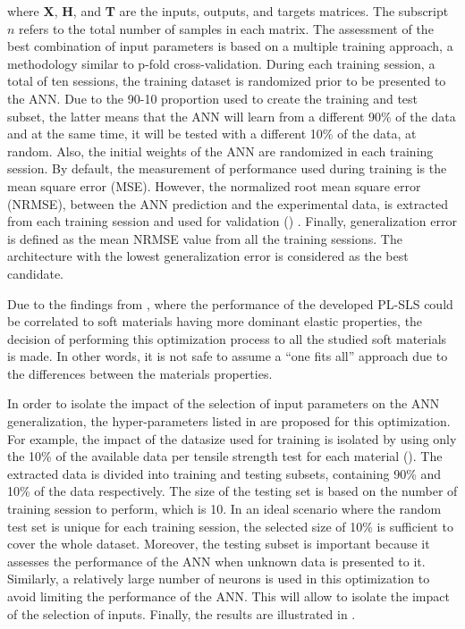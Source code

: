 \noindent where \textbf{X}, \textbf{H}, and \textbf{T} are the inputs, outputs, and targets matrices. The subscript $n$ refers to the total number of samples in each matrix. The assessment of the best combination of input parameters is based on a multiple training approach, a methodology similar to p-fold cross-validation. During each training session, a total of ten sessions, the training dataset is randomized prior to be presented to the ANN. Due to the 90-10 proportion used to create the training and test subset, the latter means that the ANN will learn from a different 90\% of the data and at the same time, it will be tested with a different 10\% of the data, at random. Also, the initial weights of the ANN are randomized in each training session. By default, the measurement of performance used during training is the mean square error (MSE). However, the normalized root mean square error (NRMSE), between the ANN prediction and the experimental data, is extracted from each training session and used for validation () \cite{bergstrom2015mechanics}. Finally, generalization error is defined as the mean NRMSE value from all the training sessions. The architecture with the lowest generalization error is considered as the best candidate.

Due to the findings from , where the performance of the developed PL-SLS could be correlated to soft materials having more dominant elastic properties, the decision of performing this optimization process to all the studied soft materials is made. In other words, it is not safe to assume a ``one fits all'' approach due to the differences between the materials properties.
 
In order to isolate the impact of the selection of input parameters on the ANN generalization, the hyper-parameters listed in  are proposed for this optimization. For example, the impact of the datasize used for training is isolated by using only the 10\% of the available data per tensile strength test for each material (). The extracted data is divided into training and testing subsets, containing 90\% and 10\% of the data respectively. The size of the testing set is based on the number of training session to perform, which is 10. In an ideal scenario where the random test set is unique for each training session, the selected size of 10\% is sufficient to cover the whole dataset. Moreover, the testing subset is important because it assesses the performance of the ANN when unknown data is presented to it. Similarly, a relatively large number of neurons is used in this optimization to avoid limiting the performance of the ANN. This will allow to isolate the impact of the selection of inputs. Finally, the results are illustrated in .

